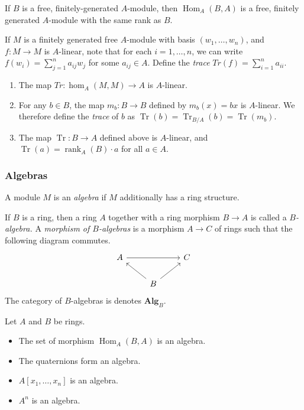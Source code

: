 \documentclass[11pt,openany]{book} %
\newcommand{\Tr}{\operatorname{Tr}}
\begin{document}
\begin{lemma}
If $B$ is a free, finitely-generated $A$-module, then $\operatorname{Hom}_A(B,A)$ is a free, finitely generated $A$-module with the same rank as $B$.
\end{lemma}
\medskip

\begin{definition}
If $M$ is a finitely generated free $A$-module with basis $(w_1,\ldots,w_n)$, and $f : M \to M$ is $A$-linear, note that for each $i=1,\ldots,n$, we can write $f(w_i) = \sum_{j=1}^{n} a_{ij}w_j$ for some $a_{ij} \in A$. Define the \emph{trace} $Tr(f) = \sum_{i=1}^{n} a_{ii}$.
\end{definition}

\begin{lemma}\hfill
	\begin{enumerate}[label=$\blacktriangleright$]
	\item The map $Tr : \hom_A(M,M) \to A$ is $A$-linear.
	\item For any $b \in B$, the map $m_b : B \to B$ defined by $m_b(x) = bx$ is $A$-linear. We therefore define the {\itshape trace} of $b$ as $\Tr(b) = \Tr_{B/A}(b) = \Tr(m_b)$.
    \item The map $\Tr : B \to A$ defined above is $A$-linear, and $\Tr(a) = \operatorname{rank}_A(B)\cdot a$ for all $a \in A$.
	\end{enumerate}
\end{lemma}

\subsubsection{Algebras}

A module $M$ is an {\itshape algebra} if $M$ additionally has a ring structure.

\begin{definition}
If $B$ is a ring, then a ring $A$ together with a ring morphism $B \to A$ is called a \emph{$B$-algebra.} A \emph{morphism of $B$-algebras} is a morphism $A \to C$ of rings such that the following diagram commutes.
\[
\begin{tikzcd}
A \ar[rr] & & C \\
& B \ar[ul] \ar[ur]
\end{tikzcd}
\]
The category of $B$-algebras is denotes $\mathbf{Alg}_B$.
\end{definition}
\medskip

\begin{example}
Let $A$ and $B$ be rings.
\begin{itemize}
	\item The set of morphism $\operatorname{Hom}_A(B,A)$ is an algebra.
    \item The quaternions form an algebra.
    \item $A[x_1,\ldots,x_n]$ is an algebra.
    \item $A^n$ is an algebra.
\end{itemize}
\end{example}
\end{document}
